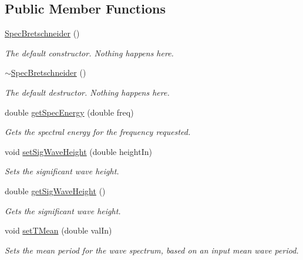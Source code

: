 \subsection*{Public Member Functions}
\begin{DoxyCompactItemize}
\item 
\hyperlink{classosea_1_1_spec_bretschneider_a6361773bb2883b20b0b9d48a281b47f9}{Spec\-Bretschneider} ()
\begin{DoxyCompactList}\small\item\em The default constructor. Nothing happens here. \end{DoxyCompactList}\item 
\hyperlink{classosea_1_1_spec_bretschneider_af574bc671ce50fb0d753551baffda77d}{$\sim$\-Spec\-Bretschneider} ()
\begin{DoxyCompactList}\small\item\em The default destructor. Nothing happens here. \end{DoxyCompactList}\item 
double \hyperlink{classosea_1_1_spec_bretschneider_ac8c105b8dab8eade862f4bb391dfc9f3}{get\-Spec\-Energy} (double freq)
\begin{DoxyCompactList}\small\item\em Gets the spectral energy for the frequency requested. \end{DoxyCompactList}\item 
void \hyperlink{classosea_1_1_spec_bretschneider_a387f42bbe729d409e8d5c07cdeee1a61}{set\-Sig\-Wave\-Height} (double height\-In)
\begin{DoxyCompactList}\small\item\em Sets the significant wave height. \end{DoxyCompactList}\item 
double \hyperlink{classosea_1_1_spec_bretschneider_a28fbea216061b8bca0798f674e69d0b9}{get\-Sig\-Wave\-Height} ()
\begin{DoxyCompactList}\small\item\em Gets the significant wave height. \end{DoxyCompactList}\item 
void \hyperlink{classosea_1_1_spec_bretschneider_afef8605abff743725c43ab30de5ed628}{set\-T\-Mean} (double val\-In)
\begin{DoxyCompactList}\small\item\em Sets the mean period for the wave spectrum, based on an input mean wave period. \end{DoxyCompactList}\item 

\end{DoxyCompactItemize}
